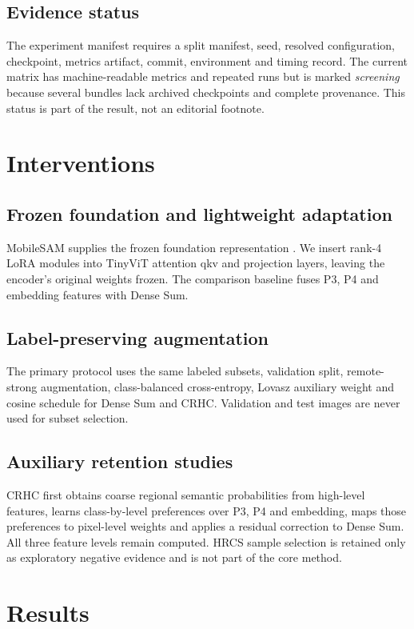 \documentclass[10pt,twocolumn]{article}
\begin{document}
\subsection{Evidence status}
The experiment manifest requires a split manifest, seed, resolved configuration, checkpoint, metrics artifact, commit, environment and timing record. The current matrix has machine-readable metrics and repeated runs but is marked \emph{screening} because several bundles lack archived checkpoints and complete provenance. This status is part of the result, not an editorial footnote.

\section{Interventions}
\subsection{Frozen foundation and lightweight adaptation}
MobileSAM supplies the frozen foundation representation \cite{zhang2023mobilesam}. We insert rank-4 LoRA modules into TinyViT attention qkv and projection layers, leaving the encoder's original weights frozen. The comparison baseline fuses P3, P4 and embedding features with Dense Sum.

\subsection{Label-preserving augmentation}
The primary protocol uses the same labeled subsets, validation split, remote-strong augmentation, class-balanced cross-entropy, Lovasz auxiliary weight and cosine schedule for Dense Sum and CRHC. Validation and test images are never used for subset selection.

\subsection{Auxiliary retention studies}
CRHC first obtains coarse regional semantic probabilities from high-level features, learns class-by-level preferences over P3, P4 and embedding, maps those preferences to pixel-level weights and applies a residual correction to Dense Sum. All three feature levels remain computed. HRCS sample selection is retained only as exploratory negative evidence and is not part of the core method.

\section{Results}
\end{document}
